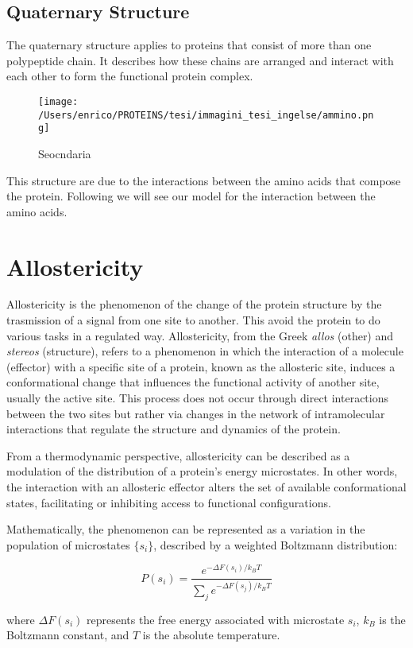 \documentclass[English, Lau, oneside]{sapthesis}
\begin{document}
\subsection{Quaternary Structure}
The quaternary structure applies to proteins that consist of more than one polypeptide chain. It describes how these chains are arranged and interact with each other to form the functional protein complex.
\begin{figure}[H]
    \centering
    \texttt{[image: /Users/enrico/PROTEINS/tesi/immagini\_tesi\_ingelse/ammino.png]}
    \caption{Seocndaria}
\end{figure}

This structure are due to the interactions between the amino acids that compose the protein. 
Following we will see our model for the interaction between the amino acids.

\section{Allostericity}
Allostericity is the phenomenon of the change of the protein structure by the trasmission of a signal from one site to another.
This avoid the protein to do various tasks in a regulated way.
Allostericity, from the Greek \textit{allos} (other) and \textit{stereos} (structure), refers to a phenomenon in which the interaction of a molecule (effector) with a specific site of a protein, known as the allosteric site, induces a conformational change that influences the functional activity of another site, usually the active site. \cite{ref5}
This process does not occur through direct interactions between the two sites but rather via changes in the network of intramolecular interactions that regulate the structure and dynamics of the protein.

From a thermodynamic perspective, allostericity can be described as a modulation of the distribution of a protein's energy microstates. 
In other words, the interaction with an allosteric effector alters the set of available conformational states, facilitating or inhibiting access to functional configurations.\cite{ref6}

Mathematically, the phenomenon can be represented as a variation in the population of microstates \(\{s_i\}\), described by a weighted Boltzmann distribution:\cite{ref6}

\[
P(s_i) = \frac{e^{-\Delta F(s_i)/k_BT}}{\sum_j e^{-\Delta F(s_j)/k_BT}}
\]

where \(\Delta F(s_i)\) represents the free energy associated with microstate \(s_i\), \(k_B\) is the Boltzmann constant, and \(T\) is the absolute temperature.
\end{document}
